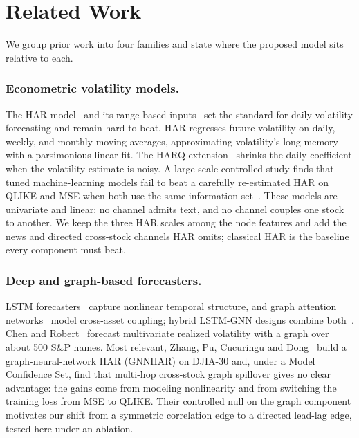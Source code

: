 \documentclass[runningheads]{llncs}
\begin{document}
\section{Related Work}
\label{sec:related}
We group prior work into four families and state where the proposed model sits relative to each.

\subsubsection{Econometric volatility models.}
The HAR model~\cite{corsi2009} and its range-based inputs~\cite{parkinson1980} set the standard for daily
volatility forecasting and remain hard to beat. HAR regresses future volatility on daily, weekly, and
monthly moving averages, approximating volatility's long memory with a parsimonious linear fit. The HARQ
extension~\cite{bpq2016} shrinks the daily coefficient when the volatility estimate is noisy. A large-scale
controlled study finds that tuned machine-learning models fail to beat a carefully re-estimated HAR on
QLIKE and MSE when both use the same information set~\cite{audrino2025}. These models are univariate and
linear: no channel admits text, and no channel couples one stock to another. We keep the three HAR scales
among the node features and add the news and directed cross-stock channels HAR omits; classical HAR is the
baseline every component must beat.

\subsubsection{Deep and graph-based forecasters.}
LSTM forecasters~\cite{hochreiter1997} capture nonlinear temporal structure, and graph attention
networks~\cite{velickovic2018} model cross-asset coupling; hybrid LSTM-GNN designs combine
both~\cite{sonani2025}. Chen and Robert~\cite{chen2022} forecast multivariate realized volatility with a
graph over about 500 S\&P names. Most relevant, Zhang, Pu, Cucuringu and Dong~\cite{zhang2025gnnhar} build a
graph-neural-network HAR (GNNHAR) on DJIA-30 and, under a Model Confidence Set, find that multi-hop
cross-stock graph spillover gives no clear advantage: the gains come from modeling nonlinearity and from
switching the training loss from MSE to QLIKE. Their controlled null on the graph component motivates our
shift from a symmetric correlation edge to a directed lead-lag edge, tested here under an ablation.
\end{document}
